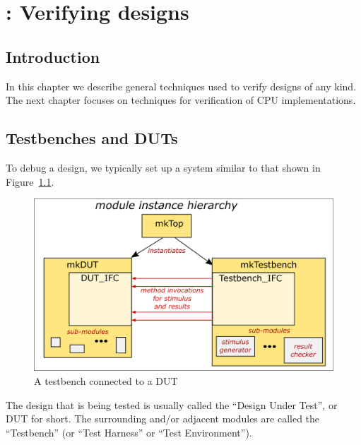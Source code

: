 

\chapter{{\BSV}: Verifying {\BSV} designs}


\setcounter{page}{1}
\renewcommand{\thepage}{\arabic{chapter}-\arabic{page}}

\label{ch_BSV_verification}


\section{Introduction}

In this chapter we describe general techniques used to verify {\BSV}
designs of any kind.  The next chapter focuses on techniques for
verification of CPU implementations.


\section{Testbenches and DUTs}


To debug a {\BSV} design, we typically set up a system similar to that
shown in Figure~\ref{Fig_Testbench_DUT}.
\begin{figure}[htbp]
  \centerline{\includegraphics[width=6in,angle=0]{Figures/Fig_Testbench_DUT}}
  \caption{\label{Fig_Testbench_DUT}
           A testbench connected to a DUT}
\end{figure}
The {\BSV} design that is being tested is usually called the ``Design
Under Test'', or DUT for short.  The surrounding and/or adjacent
modules are called the ``Testbench'' (or ``Test Harness'' or ``Test
Environment'').

